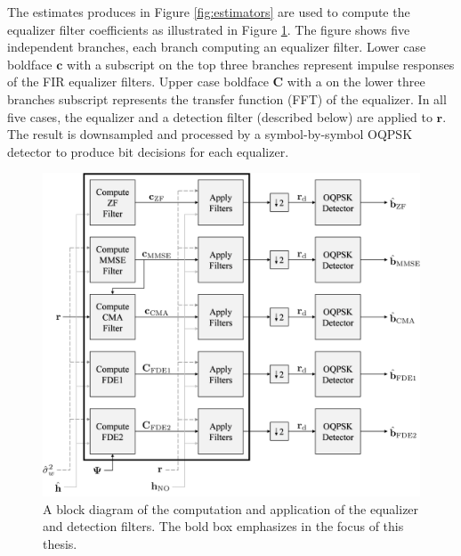 The estimates produces in Figure \ref{fig:estimators} are used to compute the equalizer filter coefficients as illustrated in Figure \ref{fig:thisThesisBlock}.
The figure shows five independent branches,
each branch computing an equalizer filter.
Lower case boldface $\mathbf{c}$ with a subscript on the top three branches represent impulse responses of the FIR equalizer filters. 
Upper case boldface $\mathbf{C}$ with a on the lower three branches subscript represents the transfer function (FFT) of the equalizer.
In all five cases, the equalizer and a detection filter (described below) are applied to $\mathbf{r}$.
The result is downsampled and processed by a symbol-by-symbol OQPSK detector to produce bit decisions for each equalizer.
\begin{figure}
	\centering\includegraphics[width=10.45in/100*55]{figures/intro/thisThesisBlock5.pdf}
	\caption{A block diagram of the computation and application of the equalizer and detection filters. The bold box emphasizes in the focus of this thesis.}
	\label{fig:thisThesisBlock}
\end{figure}
